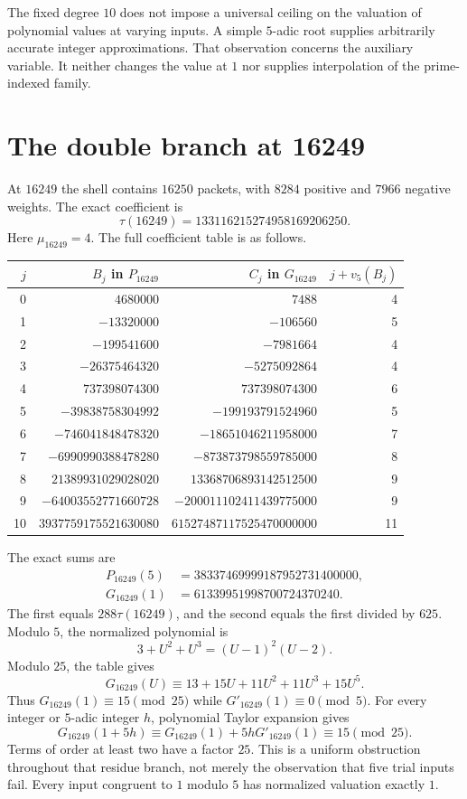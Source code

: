 The fixed degree $10$ does not impose a universal ceiling on the valuation of polynomial values at varying inputs. A simple $5$-adic root supplies arbitrarily accurate integer approximations. That observation concerns the auxiliary variable. It neither changes the value at $1$ nor supplies interpolation of the prime-indexed family.

\section{The double branch at 16249}
\label{sec:workbook-16249}

At $16249$ the shell contains $16250$ packets, with $8284$ positive and $7966$ negative weights. The exact coefficient is
\[
 \tau(16249)=133116215274958169206250.
\]
Here $\mu_{16249}=4$. The full coefficient table is as follows.

\begin{center}
\begingroup\small
\setlength{\tabcolsep}{4pt}
\begin{tabular}{r r r r}
\toprule
$j$ & $B_j$ in $P_{16249}$ & $C_j$ in $G_{16249}$ & $j+v_5(B_j)$\\
\midrule
0 & $4680000$ & $7488$ & 4\\
1 & $-13320000$ & $-106560$ & 5\\
2 & $-199541600$ & $-7981664$ & 4\\
3 & $-26375464320$ & $-5275092864$ & 4\\
4 & $737398074300$ & $737398074300$ & 6\\
5 & $-39838758304992$ & $-199193791524960$ & 5\\
6 & $-746041848478320$ & $-18651046211958000$ & 7\\
7 & $-6990990388478280$ & $-873873798559785000$ & 8\\
8 & $21389931029028020$ & $13368706893142512500$ & 9\\
9 & $-64003552771660728$ & $-200011102411439775000$ & 9\\
10 & $3937759175521630080$ & $61527487117525470000000$ & 11\\
\bottomrule
\end{tabular}
\endgroup
\end{center}

The exact sums are
\begin{align*}
 P_{16249}(5)&=38337469999187952731400000,\\
 G_{16249}(1)&=61339951998700724370240.
\end{align*}
The first equals $288\tau(16249)$, and the second equals the first divided by $625$. Modulo $5$, the normalized polynomial is
\[
 3+U^2+U^3=(U-1)^2(U-2).
\]
Modulo $25$, the table gives
\[
 G_{16249}(U)\equiv13+15U+11U^2+11U^3+15U^5.
\]
Thus $G_{16249}(1)\equiv15\pmod{25}$ while $G'_{16249}(1)\equiv0\pmod5$. For every integer or $5$-adic integer $h$, polynomial Taylor expansion gives
\[
 G_{16249}(1+5h)\equiv G_{16249}(1)+5hG'_{16249}(1)
                    \equiv15\pmod{25}.
\]
Terms of order at least two have a factor $25$. This is a uniform obstruction throughout that residue branch, not merely the observation that five trial inputs fail. Every input congruent to $1$ modulo $5$ has normalized valuation exactly $1$.

